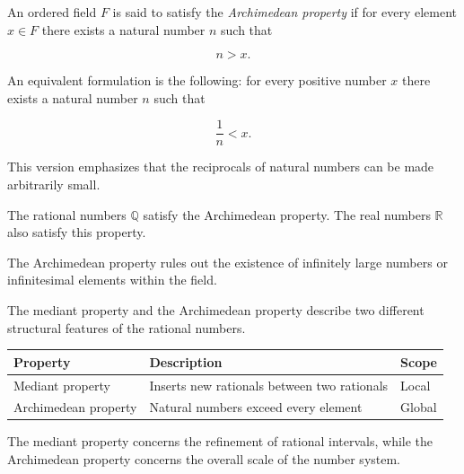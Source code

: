 
\begin{definition}
\label{def:archimedean}

An ordered field $F$ is said to satisfy the \emph{Archimedean property}
if for every element $x \in F$ there exists a natural number $n$ such
that

\[
n > x.
\]

\end{definition}

\begin{remark}

An equivalent formulation is the following: for every positive number
$x$ there exists a natural number $n$ such that

\[
\frac{1}{n} < x.
\]

This version emphasizes that the reciprocals of natural numbers can
be made arbitrarily small.

\end{remark}

\begin{remark}

The rational numbers $\mathbb{Q}$ satisfy the Archimedean property.
The real numbers $\mathbb{R}$ also satisfy this property.

The Archimedean property rules out the existence of infinitely large
numbers or infinitesimal elements within the field.

\end{remark}


\begin{remark}

The mediant property and the Archimedean property describe two
different structural features of the rational numbers.

\begin{center}
\begin{tabular}{lll}
\textbf{Property} & \textbf{Description} & \textbf{Scope} \\
\toprule
Mediant property & Inserts new rationals between two rationals & Local \\
Archimedean property & Natural numbers exceed every element & Global
\end{tabular}
\end{center}

The mediant property concerns the refinement of rational intervals,
while the Archimedean property concerns the overall scale of the
number system.

\end{remark}


